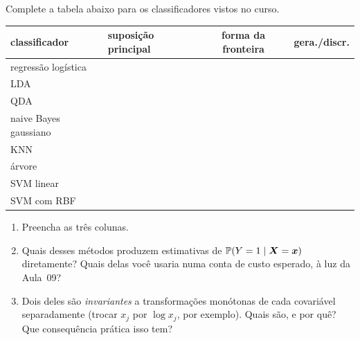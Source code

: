 \documentclass[11pt,a4paper]{article}
\begin{document}
\begin{exercicio}
Complete a tabela abaixo para os classificadores vistos no curso.
\begin{center}\small
\renewcommand{\arraystretch}{1.35}
\begin{tabular}{@{}lp{4.3cm}cc@{}}
\toprule
classificador & suposição principal & forma da fronteira & gera./discr. \\
\midrule
regressão logística & & & \\
LDA                 & & & \\
QDA                 & & & \\
naive Bayes gaussiano & & & \\
KNN                 & & & \\
árvore              & & & \\
SVM linear          & & & \\
SVM com RBF         & & & \\
\bottomrule
\end{tabular}
\end{center}
\begin{enumerate}[label=(\alph*),leftmargin=1.1cm]
  \item Preencha as três colunas.
  \item Quais desses métodos produzem estimativas de $\mathbb{P}(Y=1\mid\bm{X}=\bm{x})$
        diretamente? Quais delas você usaria numa conta de custo esperado, à luz
        da Aula~09?
  \item Dois deles são \emph{invariantes} a transformações monótonas de cada
        covariável separadamente (trocar $x_j$ por $\log x_j$, por exemplo). Quais
        são, e por quê? Que consequência prática isso tem?
\end{enumerate}
\end{exercicio}
\end{document}
